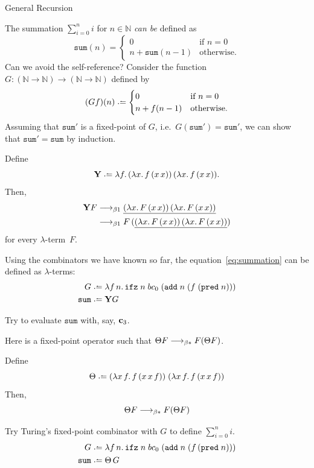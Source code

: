 \begin{frame}[allowframebreaks]{General Recursion}

  The summation $\sum_{i = 0}^{n} i$ for $n \in \mathbb{N}$ \emph{can
  be} defined as
\[
  \mathtt{sum}(n) =
    \begin{cases} 
     0 & \text{if } n = 0 \\
     n + \mathtt{sum}(n - 1)  & \text{otherwise}.
    \end{cases}
\]
Can we avoid the self-reference? Consider the function
$G\colon (\mathbb{N} \to \mathbb{N}) \to (\mathbb{N} \to \mathbb{N})$
defined by
\begin{equation} \label{eq:summation}
  (Gf)(n) \defeq
  \begin{cases}
     0 & \text{if } n = 0 \\
     n + f(n - 1)  & \text{otherwise}.
  \end{cases}
\end{equation}
Assuming that $\mathtt{sum}'$ is a fixed-point of $G$, i.e.\
$G(\mathtt{sum}') =\mathtt{sum}'$, we can show that $\mathtt{sum}' =
\mathtt{sum}$ by induction. 

\framebreak
\begin{proposition}
  Define
  \[
    \mathbf{Y} \defeq \lambda f.\, (\lambda x.\, f\,(x\,x))\,(\lambda
    x.\,f\,(x\,x)).
  \]
  Then, 
  \begin{align*}
    \mathbf{Y}F
    & \longrightarrow_{\beta1} \underline{(\lambda x.\,F\,(x\,x))\,(\lambda x.\, F\,(x\,x))} \\
    & \longrightarrow_{\beta1} F\,(\underline{(\lambda x.\,F\,(x\,x))\,(\lambda x.\,
      F\,(x\,x))})
  \end{align*}
  for every $\lambda$-term~$F$. 
\end{proposition}

\framebreak
\begin{example}
  Using the combinators we have known so far, the equation~\eqref{eq:summation}
  can be defined as $\lambda$-terms:
  \begin{align*}
    G \defeq{} & 
    \lambda f\,n.\, \mathtt{ifz}\;n\;bc_0\;
    (\add\;n\;(f\;(\mathtt{pred}\;n))) \\
    \mathtt{sum} \defeq{} & \mathbf{Y}G
  \end{align*}
\end{example}
  Try to evaluate $\mathtt{sum}$ with, say, $\mathbf{c}_3$.

\framebreak
Here is a fixed-point operator such that $\Theta F \longrightarrow_{\beta*} F(\Theta F)$.
\begin{proposition}
  Define 
  \[
    \Theta \defeq 
    (\lambda x\,f.\,f\,(x\,x\,f))\;
    (\lambda x\,f.\,f\,(x\,x\,f))
  \]
  Then, 
  \[
    \Theta F \longrightarrow_{\beta*} F (\Theta F)
  \]
\end{proposition}
Try Turing's fixed-point combinator with $G$ to define $\sum_{i=0}^n i$.
\begin{align*}
  G \defeq{} &
  \lambda f\,n.\,
  \mathtt{ifz}\;n\;bc_0\;
  (\add\;n\;(f\,(\mathtt{pred}\;n))) \\
  \mathtt{sum} \defeq\; & \Theta\,G 
\end{align*}


\end{frame}
